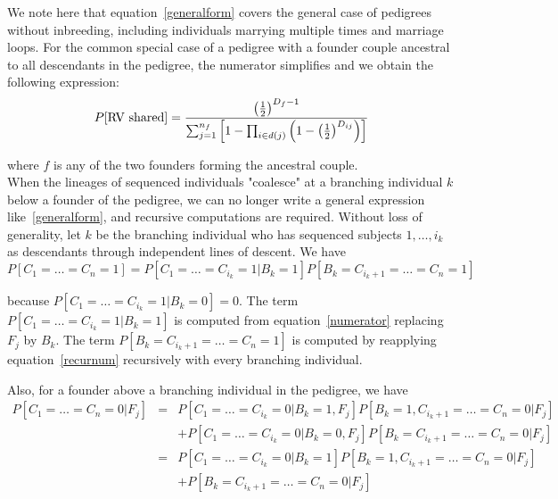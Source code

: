 \documentclass[12pt]{aastex}
\begin{document}
We note here that equation~\ref{generalform} covers the general case of pedigrees without inbreeding, including individuals marrying multiple times and marriage loops. For the common special case of a pedigree with a founder couple ancestral to all descendants in the pedigree, the numerator simplifies and we obtain the following expression:
\begin{equation}
P[\mbox{RV shared}] = \frac{  \left(1 \over 2 \right)^{D_f-1} }{\sum_{j=1}^{n_f} \left[ 1 - \prod_{i \in d(j)} \left(1 - \left(1 \over 2 \right)^{D_{ij}} \right) \right]}
\label{ancescoupleform}
\end{equation}

where $f$ is any of the two founders forming the ancestral couple.\\

When the lineages of sequenced individuals "coalesce" at a branching individual $k$ below a founder of the pedigree, we can no longer write a general expression like~\ref{generalform}, and recursive computations are required. Without loss of generality, let $k$ be the branching individual who has sequenced subjects $1, \dots, i_k$ as descendants through independent lines of descent. We have 
\begin{equation}
P[C_1 = \dots = C_n = 1 ] = P[C_1 = \dots = C_{i_k} = 1 | B_k = 1] P[ B_k = C_{i_k+1} = \dots = C_n = 1] 
\label{recurnum}
\end{equation}

because $P[C_1 = \dots = C_{i_k} = 1 | B_k = 0] = 0$. The term $ P[C_1 = \dots = C_{i_k} = 1 | B_k = 1]$ is computed from equation~\ref{numerator} replacing $F_j$ by $B_k$. The term $P[ B_k = C_{i_k+1} = \dots = C_n = 1]$ is computed by reapplying equation~\ref{recurnum} recursively with every branching individual. 

Also, for a founder above a branching individual in the pedigree, we have
\begin{eqnarray}
P[C_1 = \dots = C_n = 0 | F_j] &=& P[C_1 = \dots = C_{i_k} = 0 | B_k = 1, F_j] P[ B_k = 1, C_{i_k+1} = \dots = C_n = 0 | F_j]\nonumber \\
 & & + P[C_1 = \dots = C_{i_k} = 0 | B_k = 0, F_j] P[ B_k = C_{i_k+1} = \dots = C_n = 0 | F_j]\nonumber \\
 &=& P[C_1 = \dots = C_{i_k} = 0 | B_k = 1] P[ B_k = 1, C_{i_k+1} = \dots = C_n = 0 | F_j] \\ \label{recurdenom}
 & & + P[ B_k = C_{i_k+1} = \dots = C_n = 0 | F_j] \nonumber
\end{eqnarray}
\end{document}
